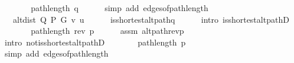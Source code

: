 \begin{isabellebody}
\ \ \isamarkupfalse%
\ \isamarkupfalse%
\ {\isachardoublequoteopen}{\isachardot}{\kern0pt}{\isachardot}{\kern0pt}{\isachardot}{\kern0pt}\ {\isacharequal}{\kern0pt}\ path{\isacharunderscore}{\kern0pt}length\ q{\isachardoublequoteclose}\isanewline
\ \ \ \ \isamarkupfalse%
\ {\isacharparenleft}{\kern0pt}simp\ add{\isacharcolon}{\kern0pt}\ edges{\isacharunderscore}{\kern0pt}of{\isacharunderscore}{\kern0pt}path{\isacharunderscore}{\kern0pt}length{\isacharparenright}{\kern0pt}\isanewline
\ \ \isamarkupfalse%
\ \isamarkupfalse%
\ {\isachardoublequoteopen}{\isachardot}{\kern0pt}{\isachardot}{\kern0pt}{\isachardot}{\kern0pt}\ {\isacharequal}{\kern0pt}\ alt{\isacharunderscore}{\kern0pt}dist\ Q\ P\ G\ v\ u{\isachardoublequoteclose}\isanewline
\ \ \ \ \isamarkupfalse%
\ is{\isacharunderscore}{\kern0pt}shortest{\isacharunderscore}{\kern0pt}alt{\isacharunderscore}{\kern0pt}path{\isacharunderscore}{\kern0pt}q\isanewline
\ \ \ \ \isamarkupfalse%
\ {\isacharparenleft}{\kern0pt}intro\ is{\isacharunderscore}{\kern0pt}shortest{\isacharunderscore}{\kern0pt}alt{\isacharunderscore}{\kern0pt}pathD{\isacharparenleft}{\kern0pt}{}{\isacharparenright}{\kern0pt}{\isacharparenright}{\kern0pt}\isanewline
\ \ \isamarkupfalse%
\ \isamarkupfalse%
\ {\isachardoublequoteopen}{\isachardot}{\kern0pt}{\isachardot}{\kern0pt}{\isachardot}{\kern0pt}\ {\isacharless}{\kern0pt}\ path{\isacharunderscore}{\kern0pt}length\ {\isacharparenleft}{\kern0pt}rev\ p{\isacharparenright}{\kern0pt}{\isachardoublequoteclose}\isanewline
\ \ \ \ \isamarkupfalse%
\ assm\ alt{\isacharunderscore}{\kern0pt}path{\isacharunderscore}{\kern0pt}rev{\isacharunderscore}{\kern0pt}p\isanewline
\ \ \ \ \isamarkupfalse%
\ {\isacharparenleft}{\kern0pt}intro\ not{\isacharunderscore}{\kern0pt}is{\isacharunderscore}{\kern0pt}shortest{\isacharunderscore}{\kern0pt}alt{\isacharunderscore}{\kern0pt}pathD{\isacharparenright}{\kern0pt}\isanewline
\ \ \isamarkupfalse%
\ \isamarkupfalse%
\ {\isachardoublequoteopen}{\isachardot}{\kern0pt}{\isachardot}{\kern0pt}{\isachardot}{\kern0pt}\ {\isacharequal}{\kern0pt}\ path{\isacharunderscore}{\kern0pt}length\ p{\isachardoublequoteclose}\isanewline
\ \ \ \ \isamarkupfalse%
\ {\isacharparenleft}{\kern0pt}simp\ add{\isacharcolon}{\kern0pt}\ edges{\isacharunderscore}{\kern0pt}of{\isacharunderscore}{\kern0pt}path{\isacharunderscore}{\kern0pt}length{\isacharparenright}{\kern0pt}\isanewline

\end{isabellebody}
